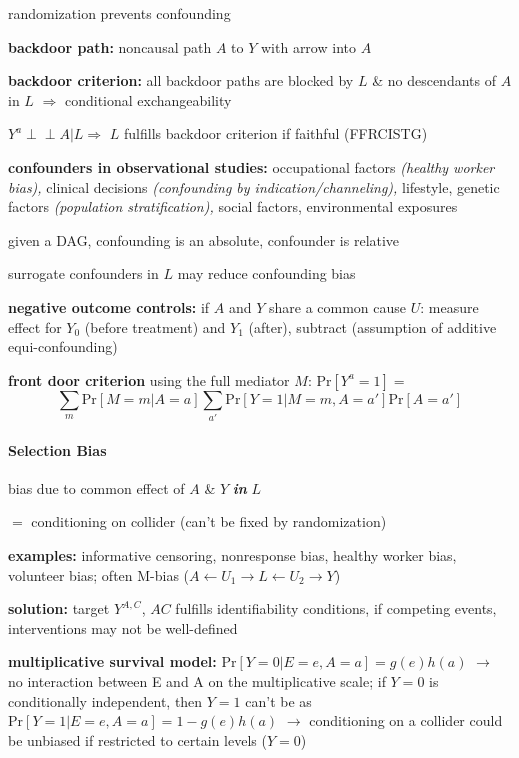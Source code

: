 \documentclass[8pt,twoside]{extarticle}
\newcommand{\indep}{\perp \!\!\! \perp}
\begin{document}
\begin{multicols}{2}
 randomization prevents confounding

 \textbf{backdoor path:} noncausal path $A$ to $Y$ with arrow into $A$

 \textbf{backdoor criterion:} all backdoor paths are blocked by $L$ \& no descendants of $A$ in $L$ $\Rightarrow$ conditional exchangeability

 $Y^a {\indep} A|L \Rightarrow$ $L$ fulfills backdoor criterion if faithful (FFRCISTG)



 \textbf{confounders in observational studies:} occupational factors \textit{(healthy worker bias),} clinical decisions \textit{(confounding by indication/channeling),} lifestyle, genetic factors \textit{(population stratification),} social factors, environmental exposures

 given a DAG, confounding is an absolute, confounder is relative

 surrogate confounders in $L$ may reduce confounding bias

 \textbf{negative outcome controls:} if $A$ and $Y$ share a common cause $U$: measure effect for $Y_0$ (before treatment) and $Y_1$ (after), subtract (assumption of additive equi-confounding)

 \textbf{front door criterion} using the full mediator $M$: $\mathrm{Pr}\left[Y^a=1\right]=$
$$\sum_m \mathrm{Pr}\left[M=m|A=a\right] \sum_{a'} \mathrm{Pr}\left[Y=1|M=m, A=a'\right]\mathrm{Pr}\left[A=a'\right]$$


\paragraph{Selection Bias} bias due to common effect of $A$ \& $Y$ \textbf{\textit{in}} $L$

  $=$ conditioning on collider (can't be fixed by randomization)


 \textbf{examples:} informative censoring, nonresponse bias, healthy worker bias, volunteer bias; often M-bias ($A {\leftarrow} U_1 {\to} L {\leftarrow} U_2 {\to} Y$)


 \textbf{solution:} target $Y^{A, C}$, $AC$ fulfills identifiability conditions, \newline
 if competing events, interventions may not be well-defined


 \textbf{multiplicative survival model:} $\mathrm{Pr}\left[Y{=}0|E{=}e, A{=}a\right]{=}g(e)h(a)$
$\rightarrow$ no interaction between E and A on the multiplicative scale; \newline
if $Y=0$ is conditionally independent, then $Y=1$ can't be as $\mathrm{Pr}\left[Y{=}1|E{=}e, A{=}a\right]{=}1-g(e)h(a)$
$\rightarrow$ conditioning on a collider could be unbiased if restricted to certain levels ($Y=0$)



\end{multicols}
\end{document}

